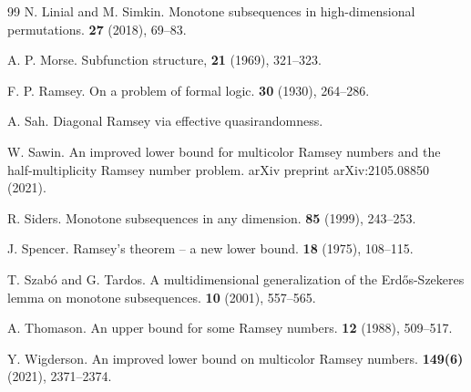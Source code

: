 \documentclass[10pt]{article}
\begin{document}
\begin{thebibliography}{99}
 N. Linial and M. Simkin. \newblock Monotone subsequences in high-dimensional permutations.  \textbf{27} (2018), 69--83.

A. P. Morse. \newblock Subfunction structure,  \textbf{21} (1969), 321--323.


F. P. Ramsey. \newblock On a problem of formal logic.  {\bf 30} (1930), 264--286.

 A. Sah. \newblock Diagonal Ramsey via effective quasirandomness. 

W. Sawin. \newblock An improved lower bound for multicolor Ramsey numbers and the half-multiplicity Ramsey number problem. \newblock arXiv preprint arXiv:2105.08850 (2021).

R. Siders. \newblock Monotone subsequences in any dimension.  \textbf{85} (1999), 243--253.

%
%
%


 J. Spencer. \newblock Ramsey's theorem -- a new lower bound.  \textbf{18} (1975),
108--115.



T. Szab\'o and G. Tardos. \newblock A multidimensional generalization of the Erd\H{o}s-Szekeres lemma on monotone
subsequences.  \textbf{10} (2001), 557--565.

A. Thomason. \newblock An upper bound for some Ramsey numbers. \textbf{12} (1988), 509--517.

Y. Wigderson. \newblock An improved lower bound on multicolor Ramsey numbers.  \textbf{149(6)} (2021), 2371--2374.


\end{thebibliography}
\end{document}

